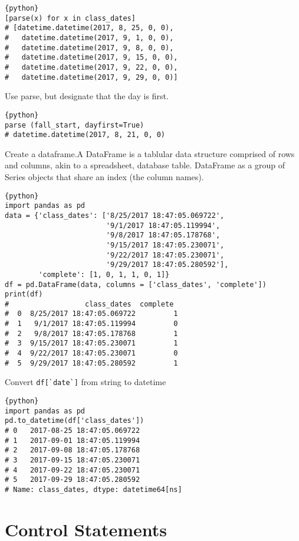 \begin{lstlisting}{python}
[parse(x) for x in class_dates] 
# [datetime.datetime(2017, 8, 25, 0, 0),
#   datetime.datetime(2017, 9, 1, 0, 0),
#   datetime.datetime(2017, 9, 8, 0, 0),
#   datetime.datetime(2017, 9, 15, 0, 0),
#   datetime.datetime(2017, 9, 22, 0, 0),
#   datetime.datetime(2017, 9, 29, 0, 0)]  
\end{lstlisting}

Use parse, but designate that the day is first.

\begin{lstlisting}{python}
parse (fall_start, dayfirst=True)
# datetime.datetime(2017, 8, 21, 0, 0)
\end{lstlisting}

Create a dataframe.A DataFrame is a tablular data structure comprised of
rows and columns, akin to a spreadsheet, database table. DataFrame as a
group of Series objects that share an index (the column names).

\begin{lstlisting}{python}
import pandas as pd
data = {'class_dates': ['8/25/2017 18:47:05.069722', 
                        '9/1/2017 18:47:05.119994', 
                        '9/8/2017 18:47:05.178768', 
                        '9/15/2017 18:47:05.230071', 
                        '9/22/2017 18:47:05.230071', 
                        '9/29/2017 18:47:05.280592'], 
        'complete': [1, 0, 1, 1, 0, 1]} 
df = pd.DataFrame(data, columns = ['class_dates', 'complete'])
print(df)
#                  class_dates  complete
#  0  8/25/2017 18:47:05.069722         1
#  1   9/1/2017 18:47:05.119994         0
#  2   9/8/2017 18:47:05.178768         1
#  3  9/15/2017 18:47:05.230071         1
#  4  9/22/2017 18:47:05.230071         0
#  5  9/29/2017 18:47:05.280592         1
\end{lstlisting}

Convert \verb|df[`date`]| from string to datetime

\begin{lstlisting}{python}
import pandas as pd
pd.to_datetime(df['class_dates'])
# 0   2017-08-25 18:47:05.069722
# 1   2017-09-01 18:47:05.119994
# 2   2017-09-08 18:47:05.178768
# 3   2017-09-15 18:47:05.230071
# 4   2017-09-22 18:47:05.230071
# 5   2017-09-29 18:47:05.280592
# Name: class_dates, dtype: datetime64[ns]
\end{lstlisting}

\section{Control Statements}\label{control-statements}

